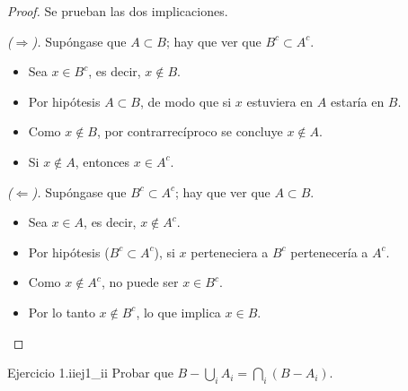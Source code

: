 \documentclass[11pt, a4paper]{article}
\begin{document}
\begin{proof}
Se prueban las dos implicaciones.

\textit{($\Rightarrow$).} Supóngase que $A \subset B$; hay que ver que $B^c \subset A^c$.
\begin{itemize}
    \item Sea $x \in B^c$, es decir, $x \notin B$.
    \item Por hipótesis $A \subset B$, de modo que si $x$ estuviera en $A$ estaría en $B$.
    \item Como $x \notin B$, por contrarrecíproco se concluye $x \notin A$.
    \item Si $x \notin A$, entonces $x \in A^c$.
\end{itemize}

\textit{($\Leftarrow$).} Supóngase que $B^c \subset A^c$; hay que ver que $A \subset B$.
\begin{itemize}
    \item Sea $x \in A$, es decir, $x \notin A^c$.
    \item Por hipótesis ($B^c \subset A^c$), si $x$ perteneciera a $B^c$ pertenecería a $A^c$.
    \item Como $x \notin A^c$, no puede ser $x \in B^c$.
    \item Por lo tanto $x \notin B^c$, lo que implica $x \in B$.
\end{itemize}
\end{proof}

\begin{proposicion}{Ejercicio 1.ii}{ej1_ii}
Probar que $B - \bigcup_{i} A_i = \bigcap_{i} (B - A_i)$.
\end{proposicion}
\end{document}
